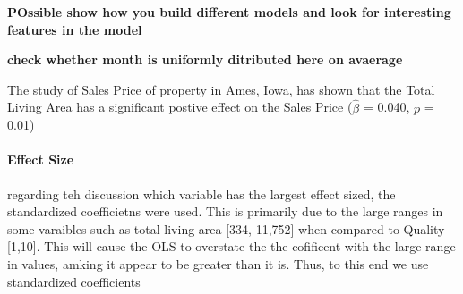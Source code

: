 \documentclass{article}
\begin{document}
\textbf{POssible show how you build different models and look for interesting features in the model}



\textbf{check whether month is uniformly ditributed here on avaerage }






















The study of Sales Price of property in Ames, Iowa, has shown that the Total Living Area has a significant postive effect on the Sales Price ($\hat{\beta}$ = 0.040, $p$ = 0.01)

\paragraph{Effect Size} regarding teh discussion which variable has the largest effect sized, the standardized coefficietns were used. This is primarily due to the large ranges in some varaibles such as total living area [334, 11,752] when compared to Quality [1,10]. This will cause the OLS to overstate the the cofificent with the large range in values, amking it appear to be greater than it is. Thus, to this end we use standardized coefficients
\end{document}
